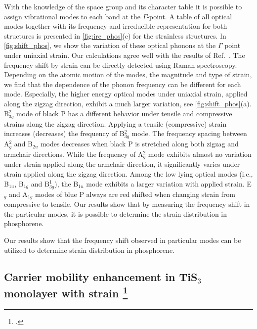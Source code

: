 With the knowledge of the space group and its character table it is possible to assign vibrational modes to each band at the $\Gamma$-point. A table of all optical modes together with its frequency and irreducible representation for both structures is presented in \autoref{fig:ire_phos}(c) for the strainless structures. In \autoref{fig:shift_phos}, we show the variation of these optical phonons at the $\Gamma$ point under uniaxial strain. Our calculations agree well with the results of Ref.~\cite{phonon-blackP-1}. The frequency shift by strain can be directly detected using Raman spectroscopy. 
Depending on the atomic motion of the modes, the magnitude and type of strain, we find that the dependence of the phonon frequency can be different for each mode. Especially, the higher energy optical modes under uniaxial strain, applied along the zigzag direction, exhibit a much larger variation, see \autoref{fig:shift_phos}(a). B$^2_{3g}$ mode of black P has a different behavior under tensile and compressive strains along the zigzag direction. Applying a tensile (compressive) strain increases (decreases) the frequency of B$^2_{3g}$ mode. The frequency spacing between A$^2_{g}$ and B$_{2u}$ modes decreases when black P is stretched along both zigzag and armchair directions. While  the frequency of A$^2_{g}$ mode exhibits almost no variation under strain applied along the armchair direction,  it significantly varies under  strain applied along the zigzag direction.
Among the low lying optical modes (i.e., B$_{1u}$, B$_{1g}$ and B$^1_{3g}$), the B$_{1u}$ mode exhibits a larger variation with applied strain. 
E$_g$ and A$_{1g}$ modes of blue P always are red shifted when changing strain from compressive to tensile. Our results show that by measuring the frequency shift in the particular modes, it is possible to determine the
strain distribution in phosphorene.  

Our results show that the frequency shift observed in particular modes can be utilized to determine strain distribution in phosphorene.

\subsection[Carrier mobility enhancement in TiS$_3$ monolayer with strain]{Carrier mobility enhancement in TiS$_3$ monolayer with strain \footcite[This work is published in:][]{Aierken2016.mobility}}

